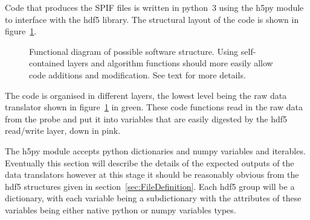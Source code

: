 \documentclass[12pt,a4paper]{article}
\begin{document}
Code that produces the SPIF files is written in python~3 using the h5py module to interface with the hdf5 library. The structural layout of the code is shown in figure~\ref{fig:SoftwareStructure}.
\begin{figure}
\begin{center}
\caption{Functional diagram of possible software structure. Using self-contained layers and algorithm functions should more easily allow code additions and modification. See text for more details.\label{fig:SoftwareStructure}}
\end{center}
\end{figure}
The code is organised in different layers, the lowest level being the raw data translator shown in figure~\ref{fig:SoftwareStructure} in green. These code functions read in the raw data from the probe and put it into variables that are easily digested by the hdf5 read/write layer, down in pink.
\par
The h5py module accepts python dictionaries and numpy variables and iterables. Eventually this section will describe the details of the expected outputs of the data translators however at this stage it should be reasonably obvious from the hdf5 structures given in section~\ref{sec:FileDefinition}. Each hdf5 group will be a dictionary, with each variable being a subdictionary with the attributes of these variables being either native python or numpy variables types.
\end{document}
